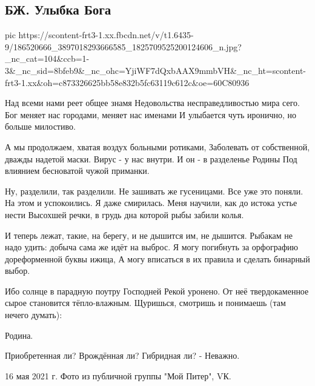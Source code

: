  
 
 
 
 

\subsection{БЖ. Улыбка Бога}
\label{sec:17_05_2021.fb.bilchenko_evgenia.1.rodina_bog}

\ifcmt
  pic https://scontent-frt3-1.xx.fbcdn.net/v/t1.6435-9/186520666_3897018293666585_1825709525200124606_n.jpg?_nc_cat=104&ccb=1-3&_nc_sid=8bfeb9&_nc_ohc=YjiWF7dQxbAAX9mmbVH&_nc_ht=scontent-frt3-1.xx&oh=c873326625bb58e832b5fc63119c612c&oe=60C80936
\fi


Над всеми нами реет общее знамя 
Недовольства несправедливостью мира сего.
Бог меняет нас городами, меняет нас именами
И улыбается чуть иронично, но больше милостиво.

А мы продолжаем, хватая воздух больными ротиками,
Заболевать от собственной, дважды надетой маски.
Вирус - у нас внутри. И он - в разделенье Родины
Под влиянием бесноватой чужой приманки.

Ну, разделили, так разделили. Не зашивать же гусеницами.
Все уже это поняли. На этом и успокоились.
Я даже смирилась. Меня научили, как до истока устье нести
Высохшей речки, в грудь дна которой рыбы забили колья.

И теперь лежат, такие, на берегу, и не дышится им, не дышится.
Рыбакам не надо удить: добыча сама же идёт на выброс.
Я могу погибнуть за орфографию дореформенной буквы ижица,
А могу вписаться в их правила и сделать бинарный выбор.

Ибо солнце в парадную поутру Господней Рекой уронено.
От неё твердокаменное сырое становится тёпло-влажным.
Щуришься, смотришь и понимаешь (там нечего думать): 

Родина.

Приобретенная ли? Врождённая ли? Гибридная ли? - Неважно.

16 мая 2021 г.
Фото из публичной группы "Мой Питер", VК.
